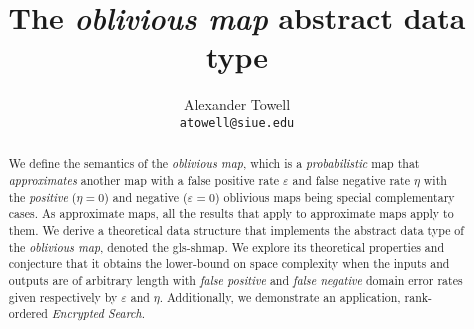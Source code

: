 \documentclass{article}
\title
{
    The \emph{oblivious map} abstract data type
}
\author
{
    Alexander Towell\\
    \texttt{atowell@siue.edu}
}
\date{}
\begin{document}
\maketitle
\begin{abstract}
We define the semantics of the \emph{oblivious map}, which is a \emph{probabilistic} map that \emph{approximates} another map with a false positive rate $\varepsilon$ and false negative rate $\eta$ with the \emph{positive} ($\eta = 0$) and negative ($\varepsilon = 0$) oblivious maps being special complementary cases. As approximate maps, all the results that apply to approximate maps apply to them. We derive a theoretical data structure that implements the abstract data type of the \emph{oblivious map}, denoted the \gls{gls-shmap}. We explore its theoretical properties and conjecture that it obtains the lower-bound on space complexity when the inputs and outputs are of arbitrary length with \emph{false positive} and \emph{false negative} domain error rates given respectively by $\varepsilon$ and $\eta$. Additionally, we demonstrate an application, rank-ordered \emph{Encrypted Search}.
\end{abstract}

\tableofcontents
\listoffigures
\listofalgorithms







\printglossary

\end{document}
